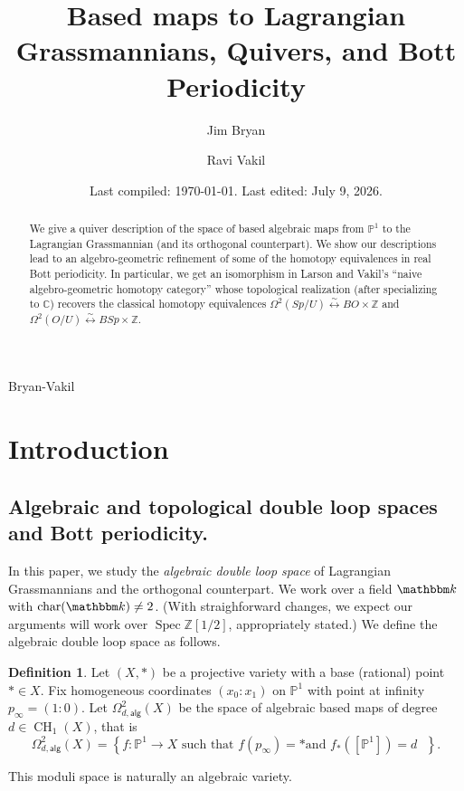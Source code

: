 \documentclass{amsart}
\title{Based maps to Lagrangian Grassmannians, Quivers, and Bott Periodicity}
\date{Last compiled:  \today.  Last edited: July 9, 2026.}
\author{Jim Bryan}
\author{Ravi Vakil}
\theoremstyle{definition}
\newtheorem{definition}[theorem]{Definition}
\newcommand{\CC} {{\mathbb C}}          %
\newcommand{\ZZ} {{\mathbb Z}}		%
\newcommand{\kk} {{\mathbbm k}}
\newcommand{\PP}{\mathbb{P}}
\newcommand{\alg}{\mathsf{alg}}
\newcommand{\LoopTwo}{\Omega^{2}_{d,\alg}}
\newcommand{\homotopyeq}{\overset \sim \longleftrightarrow}
\begin{document}
\begin{abstract}
We give a quiver description of the space of based algebraic maps from
$\PP^{1}$ to the Lagrangian Grassmannian (and its orthogonal
counterpart). We show our descriptions lead to an algebro-geometric
refinement of some of the homotopy equivalences in real Bott
periodicity. In particular, we get an isomorphism in Larson and
Vakil's ``naive algebro-geometric homotopy category''  whose topological
realization (after specializing to $\CC$) recovers the classical homotopy equivalences
$\Omega^{2}(Sp/U)\homotopyeq BO\times \ZZ$ and
$\Omega^{2}(O/U)\homotopyeq BSp\times \ZZ$.

\end{abstract}

\maketitle 

  {Bryan-Vakil}



\section{Introduction}\label{sec: intro}



\subsection{Algebraic and topological double loop spaces and Bott periodicity.}

In this paper, we study the \emph{algebraic double loop space} of
Lagrangian Grassmannians and the orthogonal counterpart. We work over
a field $\kk $ with $\operatorname{char}(\kk)\neq 2$.   (With straighforward changes, we expect our arguments will work over $\operatorname{Spec} \ZZ [1/2]$, appropriately stated.)  We define the
algebraic double loop space as follows.

\begin{definition}\label{defn: Omega2alg(X)}
Let $(X,*)$ be a projective variety with a base (rational) point $*\in X$. Fix homogeneous
coordinates $(x_{0}:x_{1})$ on $\PP^{1}$ with point at infinity
$p_{\infty}=(1:0)$. Let $\LoopTwo(X)$ be the space of algebraic based
maps of degree $d \in \operatorname{CH}_1(X)$, that is
\[
\LoopTwo (X) = \left\{f:\PP^{1}\to X\text{ such that $f(p_{\infty})=*$
and $f_{*}([\PP^{1}])=d$ } \right\} .
\]
\end{definition}
This moduli space is naturally an algebraic variety.
\end{document}
